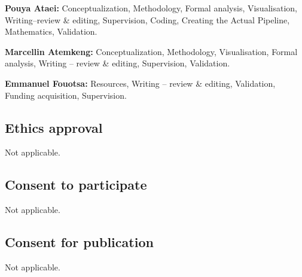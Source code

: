 \documentclass[pdflatex,sn-mathphys-num]{sn-jnl}
\begin{document}
\textbf{Pouya Ataei:} Conceptualization, Methodology, Formal analysis, Visualisation, Writing--review \& editing, Supervision, Coding, Creating the Actual Pipeline, Mathematics, Validation. 

\textbf{Marcellin Atemkeng:} Conceptualization, Methodology, Visualisation, Formal analysis, Writing -- review \& editing, Supervision, Validation. 

\textbf{Emmanuel Fouotsa:} Resources, Writing -- review \& editing, Validation, Funding acquisition, Supervision.

\subsection*{Ethics approval}
Not applicable.

\subsection*{Consent to participate}
Not applicable.

\subsection*{Consent for publication}
Not applicable.
\end{document}

